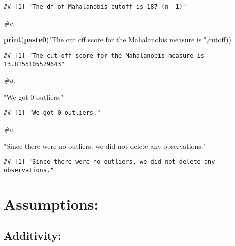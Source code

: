 \documentclass[
]{article}
\newenvironment{Shaded}{\begin{snugshade}}{\end{snugshade}}
\newcommand{\CommentTok}[1]{\textcolor[rgb]{0.56,0.35,0.01}{\textit{#1}}}
\newcommand{\KeywordTok}[1]{\textcolor[rgb]{0.13,0.29,0.53}{\textbf{#1}}}
\newcommand{\NormalTok}[1]{#1}
\newcommand{\StringTok}[1]{\textcolor[rgb]{0.31,0.60,0.02}{#1}}
\begin{document}
\begin{verbatim}
## [1] "The df of Mahalanobis cutoff is 187 (n -1)"
\end{verbatim}

\begin{Shaded}
\begin{Highlighting}[]
\CommentTok{#c.}

\KeywordTok{print}\NormalTok{(}\KeywordTok{paste0}\NormalTok{(}\StringTok{"The cut off score for the Mahalanobis measure is "}\NormalTok{,cutoff))}
\end{Highlighting}
\end{Shaded}

\begin{verbatim}
## [1] "The cut off score for the Mahalanobis measure is 13.8155105579643"
\end{verbatim}

\begin{Shaded}
\begin{Highlighting}[]
\CommentTok{#d.}

\StringTok{"We got 0 outliers."}
\end{Highlighting}
\end{Shaded}

\begin{verbatim}
## [1] "We got 0 outliers."
\end{verbatim}

\begin{Shaded}
\begin{Highlighting}[]
\CommentTok{#e.}

\StringTok{"Since there were no outliers, we did not delete any observations."}
\end{Highlighting}
\end{Shaded}

\begin{verbatim}
## [1] "Since there were no outliers, we did not delete any observations."
\end{verbatim}

\hypertarget{assumptions}{%
\section{Assumptions:}\label{assumptions}}

\hypertarget{additivity}{%
\subsection{Additivity:}\label{additivity}}
\end{document}
